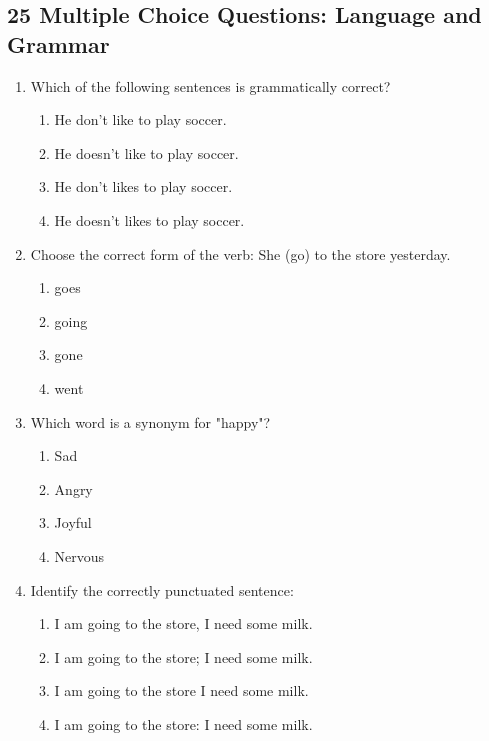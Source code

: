 \documentclass[12pt]{article}
\begin{document}
\onehalfspacing

\subsection*{25 Multiple Choice Questions: Language and Grammar}

\begin{enumerate}

    \item Which of the following sentences is grammatically correct?
    \begin{enumerate}[label=\Alph*.]
        \item He don't like to play soccer.
        \item He doesn't like to play soccer.
        \item He don't likes to play soccer.
        \item He doesn't likes to play soccer.
    \end{enumerate}
    \vspace{0.5cm}

    \item Choose the correct form of the verb: She \underline{\hspace{2cm}} (go) to the store yesterday.
    \begin{enumerate}[label=\Alph*.]
        \item goes
        \item going
        \item gone
        \item went
    \end{enumerate}
    \vspace{0.5cm}

    \item Which word is a synonym for "happy"?
    \begin{enumerate}[label=\Alph*.]
        \item Sad
        \item Angry
        \item Joyful
        \item Nervous
    \end{enumerate}
    \vspace{0.5cm}

    \item Identify the correctly punctuated sentence:
    \begin{enumerate}[label=\Alph*.]
        \item I am going to the store, I need some milk.
        \item I am going to the store; I need some milk.
        \item I am going to the store I need some milk.
        \item I am going to the store: I need some milk.
    \end{enumerate}
    \vspace{0.5cm}


\end{enumerate}
\end{document}
